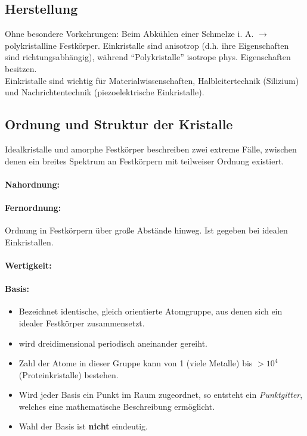 \documentclass[a4paper,12pt]{article}
\begin{document}
\subsection{Herstellung}
Ohne besondere Vorkehrungen: Beim Abkühlen einer Schmelze i. A. $ \rightarrow $ polykristalline Festkörper. Einkristalle sind anisotrop (d.h. ihre Eigenschaften sind richtungsabhängig), während \enquote{Polykristalle} isotrope phys. Eigenschaften besitzen.\\
Einkristalle sind wichtig für Materialwissenschaften, Halbleitertechnik (Silizium) und Nachrichtentechnik (piezoelektrische Einkristalle).
\subsection{Ordnung und Struktur der Kristalle}
Idealkristalle und amorphe Festkörper beschreiben zwei extreme Fälle, zwischen denen ein breites Spektrum an Festkörpern mit teilweiser Ordnung existiert.
\paragraph*{Nahordnung:}
\paragraph*{Fernordnung:} Ordnung in Festkörpern über große Abstände hinweg. Ist gegeben bei idealen Einkristallen.
\paragraph*{Wertigkeit:}
\paragraph*{Basis:} \begin{itemize}
	\item  Bezeichnet identische, gleich orientierte Atomgruppe, aus denen sich ein idealer Festkörper zusammensetzt.
	\item wird dreidimensional periodisch aneinander gereiht.
	\item Zahl der Atome in dieser Gruppe kann von 1 (viele Metalle) bis $ >10^4 $ (Proteinkristalle) bestehen.
	\item Wird jeder Basis ein Punkt im Raum zugeordnet, so entsteht ein \emph{Punktgitter}, welches eine mathematische Beschreibung ermöglicht. 
	\item Wahl der Basis ist \textbf{nicht} eindeutig.
\end{itemize}
\end{document}
